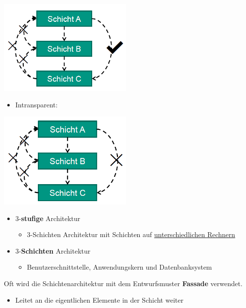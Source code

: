 \begin{center}
\includegraphics[width=0.5\textwidth]{../images/transparenteSchichtenarchitektur.png}
\end{center}
		
\newpage
\begin{itemize}	
\item Intransparent:	
\end{itemize}		
		
\begin{center}
\includegraphics[width=0.5\textwidth]{../images/intransparenteSchichtenarchitektur.png}
\end{center}

\begin{itemize}	
\item 3-\textbf{stufige} Architektur
\begin{itemize}
\item 3-Schichten Architektur mit Schichten auf \underline{unterschiedlichen Rechnern}
\end{itemize}
\item 3-\textbf{Schichten} Architektur
\begin{itemize}
\item Benutzerschnittstelle, Anwendungskern und Datenbanksystem
\end{itemize}
\end{itemize}		
Oft wird die Schichtenarchitektur mit dem Entwurfsmuster \textbf{Fassade} verwendet.
\begin{itemize}
\item Leitet an die eigentlichen Elemente in der Schicht weiter
\end{itemize}
				
